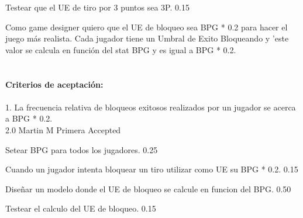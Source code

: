 		{Testear que el UE de tiro por 3 puntos sea 3P.} %
		{} %
		{0.15} %
		{} %
		{} %
		{} %

\vspace{20pt}

	{Como game designer quiero que el UE de bloqueo sea  BPG * 0.2 para hacer el juego m\'as realista.} %
	{Cada jugador tiene un Umbral de Exito Bloqueando y 'este valor se calcula en función del stat BPG y es igual a BPG * 0.2. \\
  \\
  \\
\textbf{Criterios de aceptación:}\\
  \\
1. La frecuencia relativa de bloqueos exitosos realizados por un jugador se acerca a BPG * 0.2. \\
} %
	{} %
	{2.0} %
	{Martin M} %
	{Primera} %
	{Accepted} %

		{Setear BPG para todos los jugadores.} %
		{} %
		{0.25} %
		{} %
		{} %
		{} %

		{Cuando un jugador intenta bloquear un tiro utilizar como UE su BPG * 0.2.} %
		{} %
		{0.15} %
		{} %
		{} %
		{} %

		{Diseñar un modelo donde el UE de bloqueo se calcule en funcion del BPG.} %
		{} %
		{0.50} %
		{} %
		{} %
		{} %

		{Testear el calculo del UE de bloqueo.} %
		{} %
		{0.15} %
		{} %
		{} %
		{} %

\vspace{20pt}

